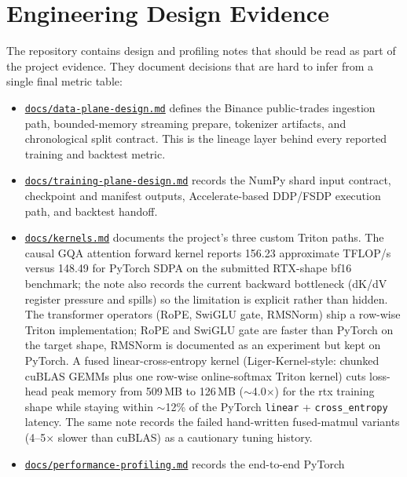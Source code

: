 \documentclass[11pt]{article}
\begin{document}
\section{Engineering Design Evidence}

The repository contains design and profiling notes that should be read as part
of the project evidence. They document decisions that are hard to infer from a
single final metric table:

\begin{itemize}
    \item \href{https://github.com/duoan/mega-trading/blob/main/docs/data-plane-design.md}{\texttt{docs/data-plane-design.md}} defines the Binance public-trades
    ingestion path, bounded-memory streaming prepare, tokenizer artifacts, and
    chronological split contract. This is the lineage layer behind every
    reported training and backtest metric.
    \item \href{https://github.com/duoan/mega-trading/blob/main/docs/training-plane-design.md}{\texttt{docs/training-plane-design.md}} records the NumPy shard input
    contract, checkpoint and manifest outputs, Accelerate-based DDP/FSDP
    execution path, and backtest handoff.
    \item \href{https://github.com/duoan/mega-trading/blob/main/docs/kernels.md}{\texttt{docs/kernels.md}} documents the project's three custom Triton
    paths. The causal GQA attention forward kernel reports 156.23 approximate
    TFLOP/s versus 148.49 for PyTorch SDPA on the submitted RTX-shape bf16
    benchmark; the note also records the current backward bottleneck (dK/dV
    register pressure and spills) so the limitation is explicit rather than
    hidden. The transformer operators (RoPE, SwiGLU gate, RMSNorm) ship a row-wise
    Triton implementation; RoPE and SwiGLU gate are faster than PyTorch on the
    target shape, RMSNorm is documented as an experiment but kept on PyTorch.
    A fused linear-cross-entropy kernel (Liger-Kernel-style: chunked cuBLAS
    GEMMs plus one row-wise online-softmax Triton kernel) cuts loss-head peak
    memory from 509\,MB to 126\,MB ($\sim$4.0$\times$) for the rtx training
    shape while staying within $\sim$12\% of the PyTorch \texttt{linear} +
    \texttt{cross\_entropy} latency. The same note records the failed
    hand-written fused-matmul variants (4--5$\times$ slower than cuBLAS) as a
    cautionary tuning history.
    \item \href{https://github.com/duoan/mega-trading/blob/main/docs/performance-profiling.md}{\texttt{docs/performance-profiling.md}} records the end-to-end PyTorch

\end{itemize}
\end{document}
